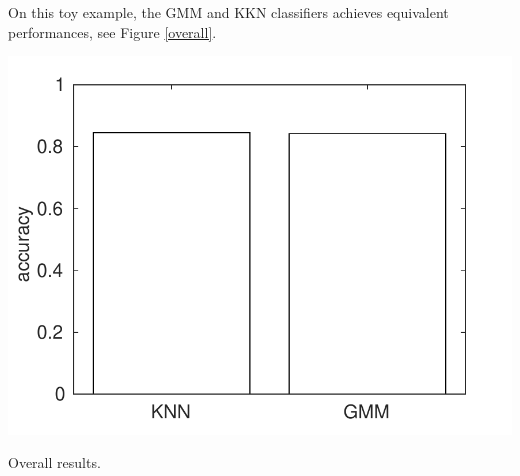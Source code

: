 \documentclass[12pt,a4paper,fleqn]{tufte-handout}
\begin{document}
On this toy example, the GMM  and KKN classifiers achieves equivalent performances, see Figure \ref{overall}.

\begin{marginfigure}
\includegraphics[width=\textwidth]{figures/overall}
\caption{Overall results.}
\label{overall}
\end{marginfigure}
  
  
  
 
 
  
\end{document}
